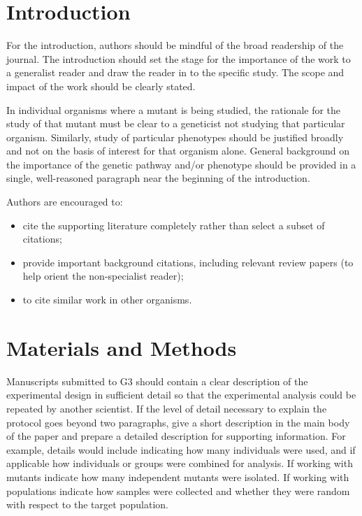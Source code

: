 \documentclass[9pt,twocolumn,twoside]{gsag3jnl}
\begin{document}
\section{Introduction}

For the introduction, authors should be mindful of the broad readership of the journal. The introduction should set the stage for the importance of the work to a generalist reader and draw the reader in to the specific study. The scope and impact of the work should be clearly stated.

In individual organisms where a mutant is being studied, the rationale for the study of that mutant must be clear to a geneticist not studying that particular organism. Similarly, study of particular phenotypes should be justified broadly and not on the basis of interest for that organism alone. General background on the importance of the genetic pathway and/or phenotype should be provided in a single, well-reasoned paragraph near the beginning of the introduction.

Authors are encouraged to:

\begin{itemize}
\item cite the supporting literature completely rather than select a subset of citations;
\item provide important background citations, including relevant review papers (to help orient the non-specialist reader);
\item to cite similar work in other organisms.
\end{itemize}

\section{Materials and Methods}
\label{sec:materials:methods}

Manuscripts submitted to G3 should contain a clear description of the experimental design in sufficient detail so that the experimental analysis could be repeated by another scientist. If the level of detail necessary to explain the protocol goes beyond two paragraphs, give a short description in the main body of the paper and prepare a detailed description for supporting information.  For example, details would include indicating how many individuals were used, and if applicable how individuals or groups were combined for analysis. If working with mutants indicate how many independent mutants were isolated. If working with populations indicate how samples were collected and whether they were random with respect to the target population.
\end{document}

